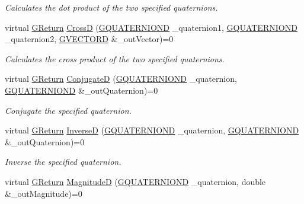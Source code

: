 \begin{DoxyCompactItemize}
\begin{DoxyCompactList}\small\item\em Calculates the dot product of the two specified quaternions. \end{DoxyCompactList}\item 
virtual \mbox{\hyperlink{namespace_g_w_a67a839e3df7ea8a5c5686613a7a3de21}{G\+Return}} \mbox{\hyperlink{class_g_w_1_1_m_a_t_h_1_1_g_quaternion_a2a2d62bed9008f304a64a32baad1a1ac}{CrossD}} (\mbox{\hyperlink{struct_g_w_1_1_m_a_t_h_1_1_g_q_u_a_t_e_r_n_i_o_n_d}{G\+Q\+U\+A\+T\+E\+R\+N\+I\+O\+ND}} \+\_\+quaternion1, \mbox{\hyperlink{struct_g_w_1_1_m_a_t_h_1_1_g_q_u_a_t_e_r_n_i_o_n_d}{G\+Q\+U\+A\+T\+E\+R\+N\+I\+O\+ND}} \+\_\+quaternion2, \mbox{\hyperlink{struct_g_w_1_1_m_a_t_h_1_1_g_v_e_c_t_o_r_d}{G\+V\+E\+C\+T\+O\+RD}} \&\+\_\+out\+Vector)=0
\begin{DoxyCompactList}\small\item\em Calculates the cross product of the two specified quaternions. \end{DoxyCompactList}\item 
virtual \mbox{\hyperlink{namespace_g_w_a67a839e3df7ea8a5c5686613a7a3de21}{G\+Return}} \mbox{\hyperlink{class_g_w_1_1_m_a_t_h_1_1_g_quaternion_af15dde55d52feeb62a3193353529b63c}{ConjugateD}} (\mbox{\hyperlink{struct_g_w_1_1_m_a_t_h_1_1_g_q_u_a_t_e_r_n_i_o_n_d}{G\+Q\+U\+A\+T\+E\+R\+N\+I\+O\+ND}} \+\_\+quaternion, \mbox{\hyperlink{struct_g_w_1_1_m_a_t_h_1_1_g_q_u_a_t_e_r_n_i_o_n_d}{G\+Q\+U\+A\+T\+E\+R\+N\+I\+O\+ND}} \&\+\_\+out\+Quaternion)=0
\begin{DoxyCompactList}\small\item\em Conjugate the specified quaternion. \end{DoxyCompactList}\item 
virtual \mbox{\hyperlink{namespace_g_w_a67a839e3df7ea8a5c5686613a7a3de21}{G\+Return}} \mbox{\hyperlink{class_g_w_1_1_m_a_t_h_1_1_g_quaternion_ac2203e68f46ae2ea0ccc185fe34c446e}{InverseD}} (\mbox{\hyperlink{struct_g_w_1_1_m_a_t_h_1_1_g_q_u_a_t_e_r_n_i_o_n_d}{G\+Q\+U\+A\+T\+E\+R\+N\+I\+O\+ND}} \+\_\+quaternion, \mbox{\hyperlink{struct_g_w_1_1_m_a_t_h_1_1_g_q_u_a_t_e_r_n_i_o_n_d}{G\+Q\+U\+A\+T\+E\+R\+N\+I\+O\+ND}} \&\+\_\+out\+Quaternion)=0
\begin{DoxyCompactList}\small\item\em Inverse the specified quaternion. \end{DoxyCompactList}\item 
virtual \mbox{\hyperlink{namespace_g_w_a67a839e3df7ea8a5c5686613a7a3de21}{G\+Return}} \mbox{\hyperlink{class_g_w_1_1_m_a_t_h_1_1_g_quaternion_a4f7486a44ec31235fe98a5ac306b3595}{MagnitudeD}} (\mbox{\hyperlink{struct_g_w_1_1_m_a_t_h_1_1_g_q_u_a_t_e_r_n_i_o_n_d}{G\+Q\+U\+A\+T\+E\+R\+N\+I\+O\+ND}} \+\_\+quaternion, double \&\+\_\+out\+Magnitude)=0

\end{DoxyCompactItemize}
